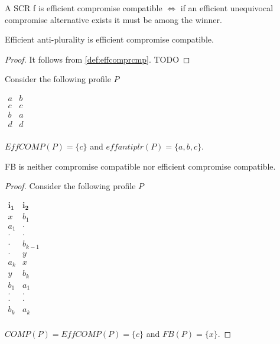 \documentclass[version=3.21, pagesize, notitlepage, twoside=off, bibliography=totoc, DIV=calc, fontsize=12pt, a4paper]{scrartcl}
\begin{document}
\begin{definition}
	\label{def:effcomprcmp}
	A SCR f is efficient compromise compatible $\iff$ if an efficient unequivocal compromise alternative exists it must be among the winner.
\end{definition}

\begin{proposition}
	Efficient anti-plurality is efficient compromise compatible.
\end{proposition}

\begin{proof}
	It follows from \ref{def:effcomprcmp}. TODO
\end{proof}
\begin{example}
	Consider the following profile $P$
	\begin{center}
		$
		\begin{array}{cc}
		a&b\\
		c&c\\
		b&a\\
		d&d\\
		\end{array}
		$
	\end{center}
	$EffCOMP(P)=\{c\}$ and $\textit{effantiplr}(P)=\{a,b,c\}$.
\end{example}
\begin{proposition}
	FB is neither compromise compatible nor efficient compromise compatible.
\end{proposition}
\begin{proof} Consider the following profile $P$
	\begin{center}
		$
		\begin{array}{cc}
		\mathbf{i_1}& \mathbf{i_2} \\
		x &b_1\\
		a_1 &\cdot\\
		\cdot &\cdot\\
		\cdot &b_{k-1}\\
		\cdot &y\\
		a_k &x\\
		y &b_k\\
		b_1 &a_1\\
		\cdot &\cdot\\
		\cdot &\cdot\\
		b_k &a_k\\
		\end{array}
		$
	\end{center}
	$COMP(P)=EffCOMP(P)=\{c\}$ and $\textit{FB}(P)=\{x\}$.
\end{proof}
\end{document}
